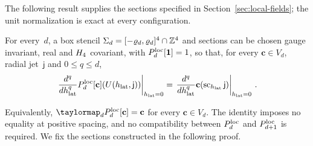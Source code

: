 The following result supplies the sections specified in Section~\ref{sec:local-fields}; the unit normalization is exact at every configuration.
\begin{lemma}\label{lem:A1}
For every~$d$, a box stencil $\Sigma_d=[-\varrho_d,\varrho_d]^4\cap\mathbb{Z}^4$ and sections can be chosen gauge invariant, real and $H_4$ covariant, with $P_{d}^{\mathrm{loc}}[\mathbf1]=1$, so that, for every $\mathbf c\in V_d$, radial jet~$\mathsf j$ and $0\le q\le d$,
\begin{equation}\label{eq:A-Taylor}
\left.\frac{d^q}{dh_{\rm lat}^q}P_{d}^{\mathrm{loc}}[\mathbf c](U(h_{\rm lat},\mathsf j))\right|_{h_{\rm lat}=0}
=\left.\frac{d^q}{dh_{\rm lat}^q}\mathbf c(\operatorname{sc}_{h_{\rm lat}}\mathsf j)\right|_{h_{\rm lat}=0}\,.
\end{equation}
\end{lemma}
Equivalently, $\taylormap_{d}\localsection{d}[\mathbf c]=\mathbf c$ for every $\mathbf c\in V_d$. The identity imposes no equality at positive spacing, and no compatibility between $P_{d}^{\mathrm{loc}}$ and $P_{d+1}^{\mathrm{loc}}$ is required. We fix the sections constructed in the following proof.


